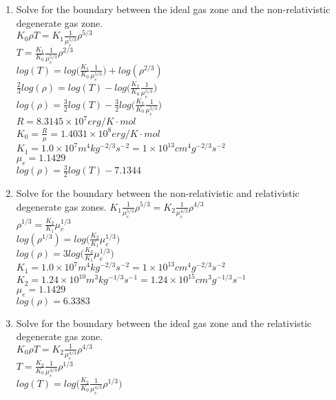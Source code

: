 \documentclass[]{article}
\begin{document}
\begin{enumerate}
{\begin{enumerate}
{		
	}
	\item{
		Solve for the boundary between the ideal gas zone and the non-relativistic degenerate gas zone.
		\\
		$K_0 \rho T = K_1\frac{1}{\mu_e^{5/3}} \rho^{5/3}$
		\\
		$T =\frac{ K_1}{K_0}\frac{1}{\mu_e^{5/3}} \rho^{2/3}$
		\\
		$log(T) =log\big(\frac{ K_1}{K_0}\frac{1}{\mu_e^{5/3}}\big) + log(\rho^{2/3})$
		\\
		$\frac{2}{3}log(\rho) = log(T) - log\big(\frac{ K_1}{K_0}\frac{1}{\mu_e^{5/3}}\big)$
		\\
		$log(\rho) = \frac{3}{2}log(T) - \frac{3}{2}log\big(\frac{ K_1}{K_0}\frac{1}{\mu_e^{5/3}}\big)$
		\\
		$R = 8.3145 \times 10^7 erg/K\cdot mol$
		\\
		$K_0 = \frac{R}{\mu}  = 1.4031\times10^8 erg/K\cdot mol$
		\\
		$K_1 = 1.0 \times 10^7 m^4 kg^{-2/3} s^{-2} = 1 \times 10^{13} cm^4 g^{-2/3} s^{-2}$
		\\
		${\mu_e} =1.1429$
		\\
		$log(\rho) = \frac{3}{2}log(T) - 7.1344$
		\\
	}
	\item{
		Solve for the boundary between the non-relativistic and relativistic degenerate gas zones.
		$K_1\frac{1}{\mu_e^{5/3}} \rho^{5/3} = K_2\frac{1}{\mu_e^{4/3}} \rho^{4/3}$
		\\
		$\rho^{1/3} = \frac{K_2}{K_1}\mu_e^{1/3}$
		\\
		$log(\rho^{1/3}) = log\big(\frac{K_2}{K_1}\mu_e^{1/3}\big)$
		\\
		$log(\rho) = 3log\big(\frac{K_2}{K_1}\mu_e^{1/3}\big)$
		\\
		$K_1 = 1.0 \times 10^7 m^4 kg^{-2/3} s^{-2} = 1 \times 10^{13} cm^4 g^{-2/3} s^{-2}$
		\\
		$K_2 = 1.24 \times 10^{10} m^3 kg^{-1/3} s^{-1} = 1.24 \times 10^{15} cm^3 g^{-1/3} s^{-1}$	
		\\
		${\mu_e} =1.1429$
		\\
		$log(\rho) = 6.3383$
	}
	\item{
		Solve for the boundary between the ideal gas zone and the relativistic degenerate gas zone.
		\\
		$K_0\rho T = K_2\frac{1}{\mu_e^{4/3}} \rho^{4/3}$
		\\
		$T = \frac{K_2}{K_0}\frac{1}{\mu_e^{4/3}} \rho^{1/3}$
		\\
		$log(T) = log\big(\frac{K_2}{K_0}\frac{1}{\mu_e^{4/3}} \rho^{1/3}\big)$
}
\end{enumerate}}
\end{enumerate}
\end{document}
